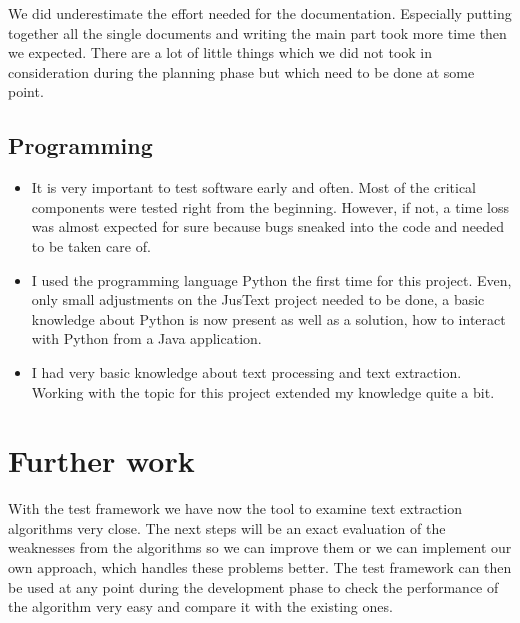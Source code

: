 We did underestimate the effort needed for the documentation. Especially putting together all the single documents and writing the main part took more time then we expected. There are a lot of little things which we did not took in consideration during the planning phase but which need to be done at some point.

\subsection{Programming}
\begin{itemize}
\item It is very important to test software early and often. Most of the critical components were tested right from the beginning. However, if not, a time loss was almost expected for sure because bugs sneaked into the code and needed to be taken care of.

\item I used the programming language Python the first time for this project. Even, only small adjustments on the JusText project needed to be done, a basic knowledge about Python is now present as well as a solution, how to interact with Python from a Java application.

\item I had very basic knowledge about text processing and text extraction. Working with the topic for this project extended my knowledge quite a bit.


\end{itemize}

\section{Further work}

With the test framework we have now the tool to examine text extraction algorithms very close. The next steps will be an exact evaluation of the weaknesses from the algorithms so we can improve them or we can implement our own approach, which handles these problems better. The test framework can then be used at any point during the development phase to check the performance of the algorithm very easy and compare it with the existing ones.  


